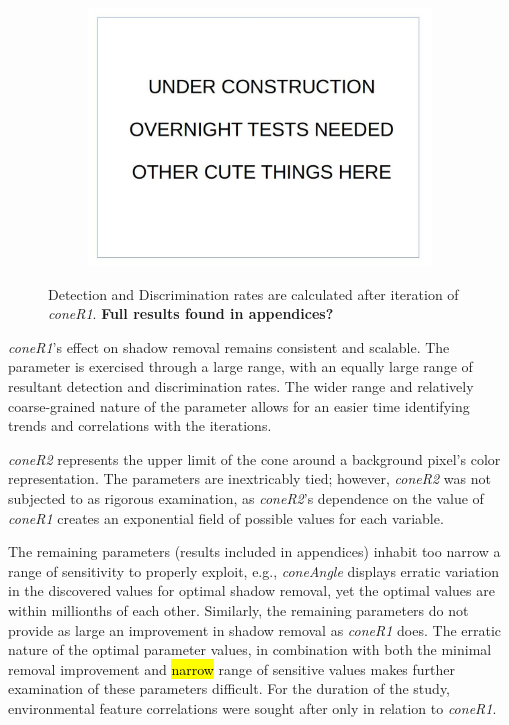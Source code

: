\documentclass[12pt]{report}
\begin{document}
\begin{figure}
\begin{subfigure}{.49\linewidth}
  \caption{}
\end{subfigure}
\hfill
\begin{subfigure}{.49\linewidth}
  \includegraphics[width=1\linewidth]{figures/placeholder.jpg}
  \caption{}
\end{subfigure}

\caption{Detection and Discrimination rates are calculated after iteration of \textit{coneR1}. \textbf{Full results found in appendices?}}
\label{fig:coneR1_iterate}
\end{figure}

\textit{coneR1}'s effect on shadow removal remains consistent and scalable. The parameter is exercised through a large range, with an equally large range of resultant detection and discrimination rates. The wider range and relatively coarse-grained nature of the parameter allows for an easier time identifying trends and correlations with the iterations. 

\textit{coneR2} represents the upper limit of the cone around a background pixel's color representation. The parameters are inextricably tied; however, \textit{coneR2} was not subjected to as rigorous examination, as \textit{coneR2}'s dependence on the value of \textit{coneR1} creates an exponential field of possible values for each variable. 

The remaining parameters (results included in appendices) inhabit too narrow a range of sensitivity to properly exploit, e.g., \textit{coneAngle} displays erratic variation in the discovered values for optimal shadow removal, yet the optimal values are within millionths of each other. Similarly, the remaining parameters do not provide as large an improvement in shadow removal as \textit{coneR1} does. The erratic nature of the optimal parameter values, in combination with both the minimal removal improvement and \hl{narrow} range of sensitive values makes further examination of these parameters difficult. For the duration of the study, environmental feature correlations were sought after only in relation to \textit{coneR1}.
\end{document}
